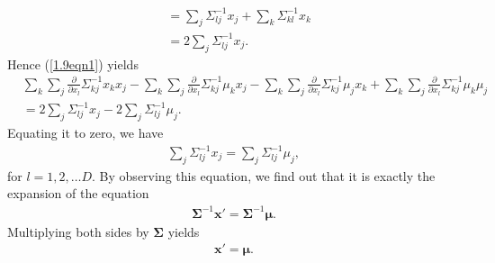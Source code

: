\begin{answer}{}
\begin{align}
		& = \sum_j \Sigma_{lj}^{-1}x_j + \sum_k \Sigma_{kl}^{-1}x_k\\
		&= 2\sum_j \Sigma_{lj}^{-1}x_j.
	\end{align}
	Hence (\ref{1.9eqn1}) yields
	\begin{align}
		&\sum_k \sum_j \frac{\partial}{\partial x_l} \Sigma_{kj}^{-1}x_k x_j - \sum_k \sum_j \frac{\partial}{\partial x_l} \Sigma_{kj}^{-1} \mu_k x_j - \sum_k \sum_j \frac{\partial}{\partial x_l} \Sigma_{kj}^{-1} \mu_j x_k + \sum_k \sum_j \frac{\partial}{\partial x_l} \Sigma_{kj}^{-1} \mu_k \mu_j\\
		&= 2\sum_j \Sigma_{lj}^{-1} x_j - 2\sum_j \Sigma_{lj}^{-1} \mu_j.
	\end{align}
	Equating it to zero, we have
	\begin{align}
		\sum_j \Sigma_{lj}^{-1} x_j =\sum_j \Sigma_{lj}^{-1} \mu_j,
	\end{align}
	for $l = 1, 2, \ldots D$. By observing this equation, we find out that it is exactly the expansion of the equation
	\begin{align}
		\bm{\Sigma}^{-1}\bm{x'} = \bm{\Sigma}^{-1}\bm{\mu}.
	\end{align}
	Multiplying both sides by $\bm{\Sigma}$ yields
	\begin{align}
		\bm{x'} = \bm{\mu}.
	\end{align}
\end{answer}